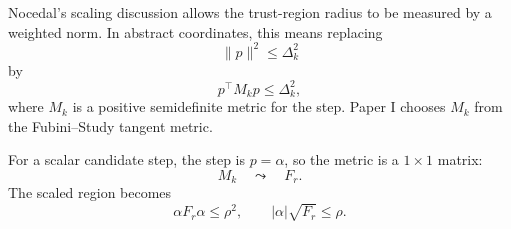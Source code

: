 \documentclass[10pt,twocolumn]{article}
\begin{document}
Nocedal's scaling discussion allows the trust-region radius to be measured by a weighted norm. In abstract coordinates, this means replacing
\begin{equation}
\|p\|^2\le\Delta_k^2
\label{eq:euclidean_region_appendix}
\end{equation}
by
\begin{equation}
p^\top M_kp\le\Delta_k^2,
\label{eq:scaled_region_appendix}
\end{equation}
where \(M_k\) is a positive semidefinite metric for the step. Paper I chooses \(M_k\) from the Fubini--Study tangent metric.

For a scalar candidate step, the step is \(p=\alpha\), so the metric is a \(1\times1\) matrix:
\begin{equation}
M_k\quad\leadsto\quad F_r.
\label{eq:scalar_metric_F}
\end{equation}
The scaled region becomes
\begin{equation}
\alpha F_r\alpha\le\rho^2,
\qquad
|\alpha|\sqrt{F_r}\le\rho.
\label{eq:scalar_scaled_region}
\end{equation}
\end{document}
